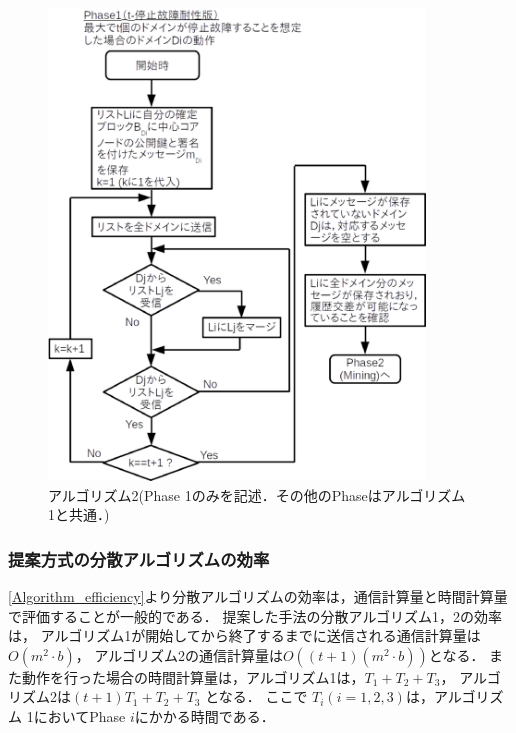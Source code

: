 \documentclass[a4paper,12pt]{jsarticle}
\begin{document}
\begin{figure}[H]%
  \begin{center}
    \includegraphics[width=100mm]{pht/flow_chart-algorithm2.eps}
  \end{center}
  \caption{アルゴリズム2(Phase 1のみを記述．その他のPhaseはアルゴリズム1と共通．)}
  \label{fig:algorithm2}
\end{figure}
%

\subsubsection{提案方式の分散アルゴリズムの効率}%
\ref{Algorithm_efficiency}より分散アルゴリズムの効率は，通信計算量と時間計算量で評価することが一般的である．
提案した手法の分散アルゴリズム1，2の効率は，
アルゴリズム1が開始してから終了するまでに送信される通信計算量は$O(m^2 \cdot b)$，
アルゴリズム2の通信計算量は$O((t+1)(m^2 \cdot b))$となる．
また動作を行った場合の時間計算量は，アルゴリズム1は，$ T_1 + T_2 + T_3 $，
アルゴリズム2は$ ( t + 1 ) T_1 + T_2 + T_3 $ となる．
ここで $T_i (i=1, 2, 3)$は，アルゴリズム 1においてPhase $i$にかかる時間である．
\end{document}
